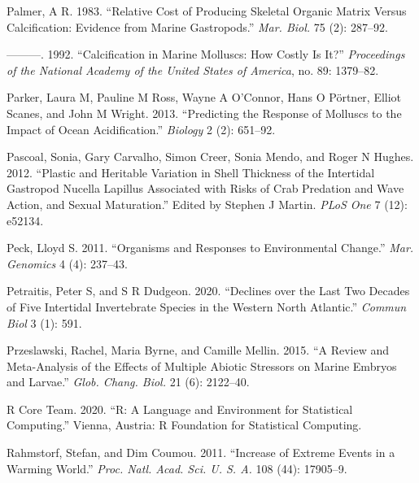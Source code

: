 \documentclass[smallextended]{svjour3}       %
\newlength{\cslhangindent}
\newenvironment{CSLReferences}[2] %
 {%
  \setlength{\parindent}{0pt}
  \ifodd #1 \everypar{\setlength{\hangindent}{\cslhangindent}}\ignorespaces\fi
  \ifnum #2 > 0
  \setlength{\parskip}{#2\baselineskip}
  \fi
 }%
 {}
\begin{document}
\begin{CSLReferences}{1}{0}
\leavevmode{}%
Palmer, A R. 1983. {``Relative Cost of Producing Skeletal Organic Matrix
Versus Calcification: Evidence from Marine Gastropods.''} \emph{Mar.
Biol.} 75 (2): 287--92.

\leavevmode{}%
---------. 1992. {``Calcification in Marine Molluscs: How Costly Is
It?''} \emph{Proceedings of the National Academy of the United States of
America}, no. 89: 1379--82.

\leavevmode{}%
Parker, Laura M, Pauline M Ross, Wayne A O'Connor, Hans O Pörtner,
Elliot Scanes, and John M Wright. 2013. {``Predicting the Response of
Molluscs to the Impact of Ocean Acidification.''} \emph{Biology} 2 (2):
651--92.

\leavevmode{}%
Pascoal, Sonia, Gary Carvalho, Simon Creer, Sonia Mendo, and Roger N
Hughes. 2012. {``Plastic and Heritable Variation in Shell Thickness of
the Intertidal Gastropod Nucella Lapillus Associated with Risks of Crab
Predation and Wave Action, and Sexual Maturation.''} Edited by Stephen J
Martin. \emph{PLoS One} 7 (12): e52134.

\leavevmode{}%
Peck, Lloyd S. 2011. {``Organisms and Responses to Environmental
Change.''} \emph{Mar. Genomics} 4 (4): 237--43.

\leavevmode{}%
Petraitis, Peter S, and S R Dudgeon. 2020. {``Declines over the Last Two
Decades of Five Intertidal Invertebrate Species in the Western North
Atlantic.''} \emph{Commun Biol} 3 (1): 591.

\leavevmode{}%
Przeslawski, Rachel, Maria Byrne, and Camille Mellin. 2015. {``A Review
and Meta-Analysis of the Effects of Multiple Abiotic Stressors on Marine
Embryos and Larvae.''} \emph{Glob. Chang. Biol.} 21 (6): 2122--40.

\leavevmode{}%
R Core Team. 2020. {``R: A Language and Environment for Statistical
Computing.''} Vienna, Austria: R Foundation for Statistical Computing.

\leavevmode{}%
Rahmstorf, Stefan, and Dim Coumou. 2011. {``Increase of Extreme Events
in a Warming World.''} \emph{Proc. Natl. Acad. Sci. U. S. A.} 108 (44):
17905--9.


\end{CSLReferences}
\end{document}
